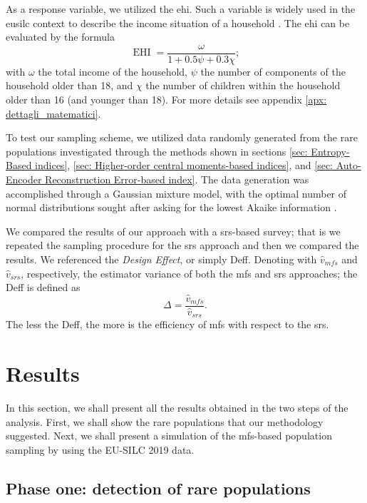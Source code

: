 As a response variable, we utilized the \gls{ehi}.
Such a variable is widely used in the \gls{eusilc} context to describe the income situation of a household \cite[]{longford2014statistical}.
The \gls{ehi} can be evaluated by the formula
\begin{equation}
    \operatorname{EHI} = \frac{\omega}{1+0.5\psi+0.3\chi};
\end{equation}
with $\omega$ the total income of the household, $\psi$ the number of components of the household older than 18, and $\chi$ the number of children within the household older than 16 (and younger than 18). 
For more details see appendix \ref{apx: dettagli_matematici}.

To test our sampling scheme, we utilized data randomly generated from the rare populations investigated through the methods shown in sections \ref{sec: Entropy-Based indices}, \ref{sec: Higher-order central moments-based indices}, and \ref{sec: Auto-Encoder Reconstruction Error-based index}.
The data generation was accomplished through a Gaussian mixture model, with the optimal number of normal distributions sought after asking for the lowest Akaike information \cite[]{akaike1976canonical}.

We compared the results of our approach with a \gls{srs}-based survey; that is we repeated the sampling procedure for the \gls{srs} approach and then we compared the results.
We referenced the \emph{Design Effect}, or simply Deff.
Denoting with $\hat{v}_{mfs}$ and $\hat{v}_{srs}$, respectively, the estimator variance of both the \gls{mfs} and \gls{srs} approaches; the Deff is defined as
$$\Delta = \frac{\hat{v}_{mfs}}{\hat{v}_{srs}}.$$
The less the Deff, the more is the efficiency of \gls{mfs} with respect to the \gls{srs}.

\section{Results}\label{sec: results}
In this section, we shall present all the results obtained in the two steps of the analysis.
First, we shall show the rare populations that our methodology suggested.
Next, we shall present a simulation of the \gls{mfs}-based population sampling by using the EU-SILC 2019 data.

\subsection{Phase one: detection of rare populations}\label{sec: detecting_rare_populations}


